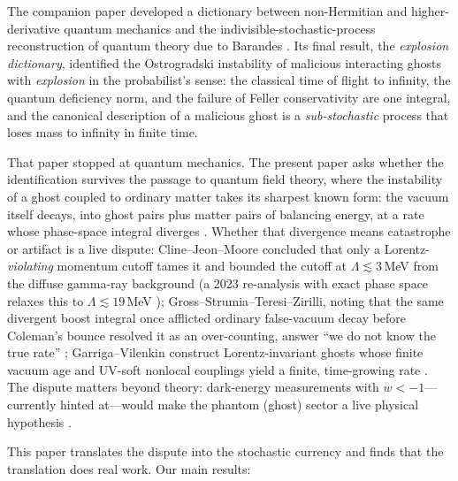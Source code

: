 \documentclass[11pt]{article}
\theoremstyle{definition}
\theoremstyle{remark}
\begin{document}
The companion paper \cite{indivisible} developed a dictionary between
non-Hermitian and higher-derivative quantum mechanics and the
indivisible-stochastic-process reconstruction of quantum theory due
to Barandes \cite{Barandes2023,Barandes2025}. Its final result, the
\emph{explosion dictionary}, identified the Ostrogradski instability
of malicious interacting ghosts \cite{PaisUhlenbeck1950,Smilga2005}
with \emph{explosion} in the probabilist's sense: the classical time
of flight to infinity, the quantum deficiency norm, and the failure
of Feller conservativity are one integral, and the canonical
description of a malicious ghost is a \emph{sub-stochastic} process
that loses mass to infinity in finite time.

That paper stopped at quantum mechanics. The present paper asks
whether the identification survives the passage to quantum field
theory, where the instability of a ghost coupled to ordinary matter
takes its sharpest known form: the vacuum itself decays, into ghost
pairs plus matter pairs of balancing energy, at a rate whose
phase-space integral diverges \cite{CHT2003,CJM2004}. Whether that
divergence means catastrophe or artifact is a live dispute:
Cline--Jeon--Moore concluded that only a Lorentz-\emph{violating}
momentum cutoff tames it and bounded the cutoff at
$\Lambda\lesssim3\,$MeV from the diffuse gamma-ray background
\cite{CJM2004} (a 2023 re-analysis with exact phase space relaxes
this to $\Lambda\lesssim19\,$MeV \cite{ClinePhantom2024}); Gross--Strumia--Teresi--Zirilli, noting that the same
divergent boost integral once afflicted ordinary false-vacuum decay
before Coleman's bounce resolved it as an over-counting, answer
``we do not know the true rate'' \cite{GSTZ2021};
Garriga--Vilenkin construct Lorentz-invariant ghosts whose finite
vacuum age and UV-soft nonlocal couplings yield a finite,
time-growing rate \cite{GV2013}. The dispute matters beyond theory:
dark-energy measurements with $w<-1$---currently hinted at---would
make the phantom (ghost) sector a live physical hypothesis
\cite{CHT2003,ClinePhantom2024}.

This paper translates the dispute into the stochastic currency and
finds that the translation does real work. Our main results:
\end{document}
